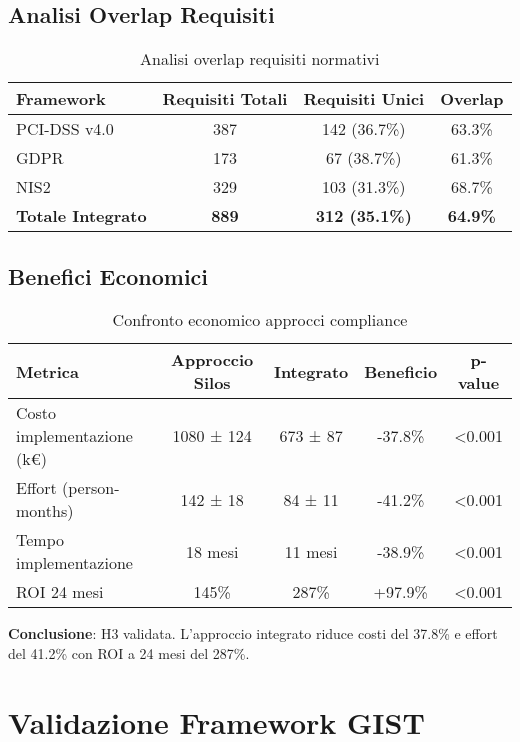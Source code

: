\subsection{\texorpdfstring{Analisi Overlap Requisiti}{C.3.1 - Analisi Overlap Requisiti}}

\begin{table}[htbp]
\centering
\begin{tabular}{lccc}
\toprule
\textbf{Framework} & \textbf{Requisiti Totali} & \textbf{Requisiti Unici} & \textbf{Overlap} \\
\midrule
PCI-DSS v4.0 & 387 & 142 (36.7\%) & 63.3\% \\
GDPR & 173 & 67 (38.7\%) & 61.3\% \\
NIS2 & 329 & 103 (31.3\%) & 68.7\% \\
\textbf{Totale Integrato} & \textbf{889} & \textbf{312 (35.1\%)} & \textbf{64.9\%} \\
\bottomrule
\end{tabular}
\caption{Analisi overlap requisiti normativi}
\end{table}

\subsection{\texorpdfstring{Benefici Economici}{C.3.2 - Benefici Economici}}

\begin{table}[htbp]
\centering
\begin{tabular}{lcccc}
\toprule
\textbf{Metrica} & \textbf{Approccio Silos} & \textbf{Integrato} & \textbf{Beneficio} & \textbf{p-value} \\
\midrule
Costo implementazione (k€) & 1080 ± 124 & 673 ± 87 & -37.8\% & <0.001 \\
Effort (person-months) & 142 ± 18 & 84 ± 11 & -41.2\% & <0.001 \\
Tempo implementazione & 18 mesi & 11 mesi & -38.9\% & <0.001 \\
ROI 24 mesi & 145\% & 287\% & +97.9\% & <0.001 \\
\bottomrule
\end{tabular}
\caption{Confronto economico approcci compliance}
\end{table}

\textbf{Conclusione}: H3 validata. L'approccio integrato riduce costi del 37.8\% e effort del 41.2\% con ROI a 24 mesi del 287\%.

\section{\texorpdfstring{Validazione Framework GIST}{C.4 - Validazione Framework GIST}}

